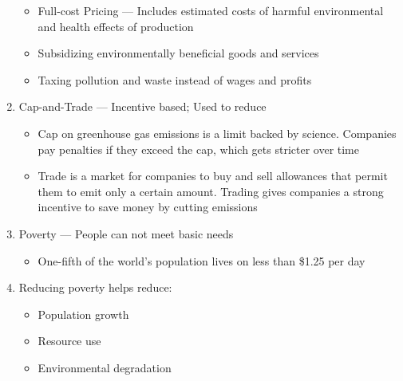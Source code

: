 \documentclass[12pt]{article}
\begin{document}
\begin{enumerate}
    \begin{itemize}

      \item Full-cost Pricing — Includes estimated costs of harmful environmental and health effects of production

      \item Subsidizing environmentally beneficial goods and services

      \item Taxing pollution and waste instead of wages and profits
        
    \end{itemize}

  \item Cap-and-Trade — Incentive based; Used to reduce 

    \begin{itemize}

      \item Cap on greenhouse gas emissions is a limit backed by science. Companies pay penalties if they exceed the cap, which gets stricter over time

      \item Trade is a market for companies to buy and sell allowances that permit them to emit only a certain amount. Trading gives companies a strong incentive to save money by cutting emissions

    \end{itemize}

  \item Poverty — People can not meet basic needs

    \begin{itemize}

      \item One-fifth of the world's population lives on less than \$1.25 per day

    \end{itemize}

  \item Reducing poverty helps reduce:

    \begin{itemize}

      \item Population growth

      \item Resource use

      \item Environmental degradation


\end{itemize}
\end{enumerate}
\end{document}
